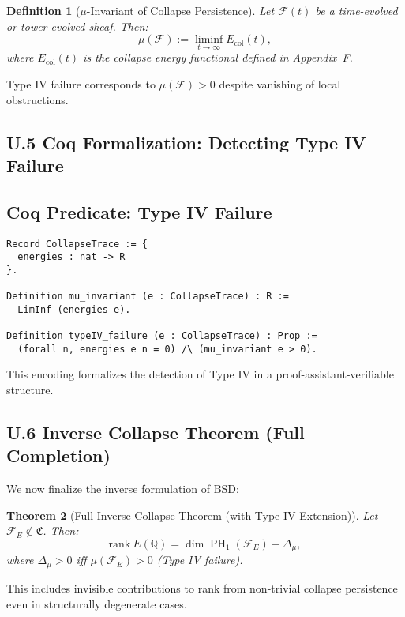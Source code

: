 \documentclass[11pt]{article}
\newtheorem{theorem}{Theorem}[section]
\newtheorem{definition}[theorem]{Definition}
\DeclareMathOperator{\PH}{PH}
\begin{document}
\begin{definition}[\( \mu \)-Invariant of Collapse Persistence]
Let \( \mathcal{F}(t) \) be a time-evolved or tower-evolved sheaf. Then:
\[
\mu(\mathcal{F}) := \liminf_{t \to \infty} E_{\mathrm{col}}(t),
\]
where \( E_{\mathrm{col}}(t) \) is the collapse energy functional defined in Appendix~F.
\end{definition}

Type IV failure corresponds to \( \mu(\mathcal{F}) > 0 \) despite vanishing of local obstructions.

\subsection*{U.5 Coq Formalization: Detecting Type IV Failure}

\subsection*{Coq Predicate: Type IV Failure}
\begin{lstlisting}[language=Coq]
Record CollapseTrace := {
  energies : nat -> R
}.

Definition mu_invariant (e : CollapseTrace) : R :=
  LimInf (energies e).

Definition typeIV_failure (e : CollapseTrace) : Prop :=
  (forall n, energies e n = 0) /\ (mu_invariant e > 0).
\end{lstlisting}

This encoding formalizes the detection of Type IV in a proof-assistant-verifiable structure.

\subsection*{U.6 Inverse Collapse Theorem (Full Completion)}

We now finalize the inverse formulation of BSD:

\begin{theorem}[Full Inverse Collapse Theorem (with Type IV Extension)]
\label{thm:inverse-collapse-final}
Let \( \mathcal{F}_E \notin \mathfrak{C} \). Then:
\[
\mathrm{rank}~E(\mathbb{Q}) = \dim \PH_1(\mathcal{F}_E) + \Delta_{\mu},
\]
where \( \Delta_{\mu} > 0 \) iff \( \mu(\mathcal{F}_E) > 0 \) (Type IV failure).
\end{theorem}

This includes invisible contributions to rank from non-trivial collapse persistence even in structurally degenerate cases.
\end{document}
